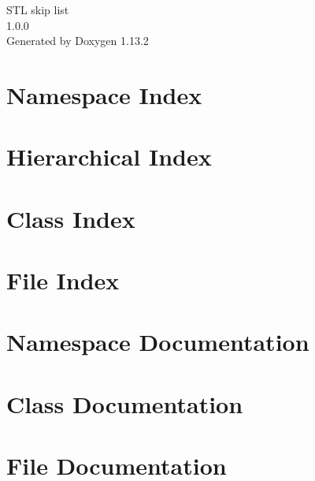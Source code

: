 \documentclass[twoside]{book}
\newcommand{\+}{\discretionary{\mbox{\scriptsize$\hookleftarrow$}}{}{}}
\newcommand{\clearemptydoublepage}{%
    \newpage{\pagestyle{empty}\cleardoublepage}%
  }
\begin{document}
  \raggedbottom
    \hypersetup{pageanchor=false,
                bookmarksnumbered=true,
                pdfencoding=unicode
               }
  \begin{titlepage}
  \vspace*{7cm}
  \begin{center}%
  {\Large STL skip list}\\
  [1ex]\large 1.\+0.\+0 \\
  \vspace*{1cm}
  {\large Generated by Doxygen 1.13.2}\\
  \end{center}
  \end{titlepage}
  \clearemptydoublepage
  \tableofcontents
  \clearemptydoublepage
  \hypersetup{pageanchor=true}
\chapter{Namespace Index}

\chapter{Hierarchical Index}

\chapter{Class Index}

\chapter{File Index}

\chapter{Namespace Documentation}

\chapter{Class Documentation}





\chapter{File Documentation}









  \backmatter
  \newpage
  \clearemptydoublepage
  \printindex
\end{document}
